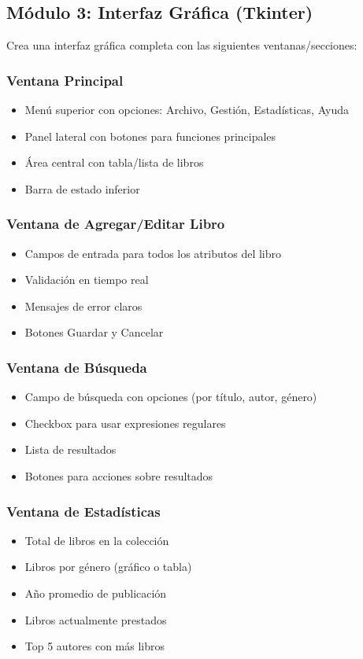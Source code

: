 \documentclass[12pt,a4paper]{article}
\begin{document}
\subsection{Módulo 3: Interfaz Gráfica (Tkinter)}

Crea una interfaz gráfica completa con las siguientes ventanas/secciones:

\subsubsection{Ventana Principal}
\begin{itemize}[leftmargin=*]
    \item Menú superior con opciones: Archivo, Gestión, Estadísticas, Ayuda
    \item Panel lateral con botones para funciones principales
    \item Área central con tabla/lista de libros
    \item Barra de estado inferior
\end{itemize}

\subsubsection{Ventana de Agregar/Editar Libro}
\begin{itemize}[leftmargin=*]
    \item Campos de entrada para todos los atributos del libro
    \item Validación en tiempo real
    \item Mensajes de error claros
    \item Botones Guardar y Cancelar
\end{itemize}

\subsubsection{Ventana de Búsqueda}
\begin{itemize}[leftmargin=*]
    \item Campo de búsqueda con opciones (por título, autor, género)
    \item Checkbox para usar expresiones regulares
    \item Lista de resultados
    \item Botones para acciones sobre resultados
\end{itemize}

\subsubsection{Ventana de Estadísticas}
\begin{itemize}[leftmargin=*]
    \item Total de libros en la colección
    \item Libros por género (gráfico o tabla)
    \item Año promedio de publicación
    \item Libros actualmente prestados
    \item Top 5 autores con más libros
\end{itemize}
\end{document}
